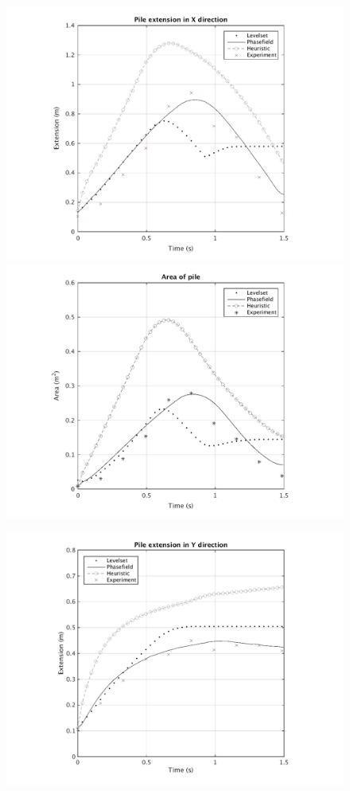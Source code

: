 \documentclass[letterpaper,10pt]{article}
\begin{document}
\begin{figure}[H]
	\begin{minipage}[b]{.48\linewidth}
		\centering
		\includegraphics[scale=0.48]{IMAGES/xextend.png}
		\includegraphics[scale=0.48]{IMAGES/area.png}
	\end{minipage}
	\begin{minipage}[b]{.48 \linewidth}
		\centering
		\includegraphics[scale=0.48]{IMAGES/yextend.png}

\end{minipage}
\end{figure}
\end{document}
